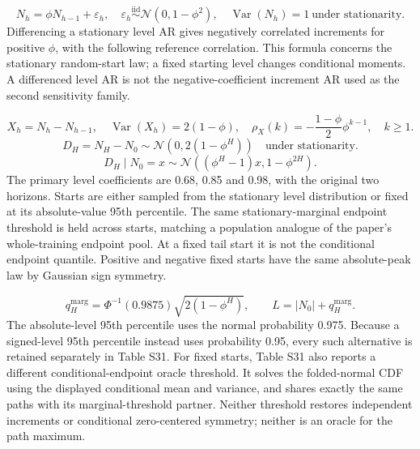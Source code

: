 \documentclass[11pt,a4paper]{article}
\begin{document}
\[
N_h=\phi N_{h-1}+\varepsilon_h,\quad\varepsilon_h\overset{\mathrm{iid}}\sim\mathcal N(0,1-\phi^2),\quad\operatorname{Var}(N_h)=1\ \text{under stationarity}.
\]
Differencing a stationary level AR gives negatively correlated increments for positive \(\phi\), with the following reference correlation. This formula concerns the stationary random-start law; a fixed starting level changes conditional moments. A differenced level AR is not the negative-coefficient increment AR used as the second sensitivity family.

\[
X_h=N_h-N_{h-1},\quad\operatorname{Var}(X_h)=2(1-\phi),\quad\rho_X(k)=-\frac{1-\phi}{2}\phi^{k-1},\quad k\ge1.
\]
\[
D_H=N_H-N_0\sim\mathcal N\!\left(0,2(1-\phi^H)\right)\quad\text{under stationarity}.
\]
\[
D_H\mid N_0=x\sim\mathcal N\!\left((\phi^H-1)x,1-\phi^{2H}\right).
\]
The primary level coefficients are 0.68, 0.85 and 0.98, with the original two horizons. Starts are either sampled from the stationary level distribution or fixed at its absolute-value 95th percentile. The same stationary-marginal endpoint threshold is held across starts, matching a population analogue of the paper's whole-training endpoint pool. At a fixed tail start it is not the conditional endpoint quantile. Positive and negative fixed starts have the same absolute-peak law by Gaussian sign symmetry.

\[
q_H^{\mathrm{marg}}=\Phi^{-1}(0.9875)\sqrt{2(1-\phi^H)},\qquad L=|N_0|+q_H^{\mathrm{marg}}.
\]
The absolute-level 95th percentile uses the normal probability 0.975. Because a signed-level 95th percentile instead uses probability 0.95, every such alternative is retained separately in Table S31. For fixed starts, Table S31 also reports a different conditional-endpoint oracle threshold. It solves the folded-normal CDF using the displayed conditional mean and variance, and shares exactly the same paths with its marginal-threshold partner. Neither threshold restores independent increments or conditional zero-centered symmetry; neither is an oracle for the path maximum.
\end{document}
